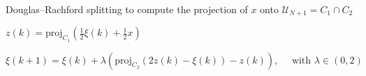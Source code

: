 \documentclass[10pt]{article}
\newtheorem{definitiox	n}{Definition}{\it}{}
\newtheorem{assumption}{Assumption}{\it}{}
\newcommand{\mc}{\mathcal}
\newcommand{\bb}{\mathbb}
\newcommand{\proj}{\mathrm{proj}}
\newcommand{\0}{\mathbf{0}}
\newcommand{\1}{\mathbf{1}}
\begin{document}
\begin{algorithm}[]
\caption{Douglas--Rachford splitting to compute the projection of $x$ onto $\mathcal{U}_{N+1} = C_1 \cap C_2$}
\begin{algorithmic}[1]

\smallskip
\IUC{ }

\smallskip
\State
$z(k) = \proj_{C_1}(\frac{1}{2} \xi(k) + \frac{1}{2}x)$ 


\smallskip
\State
$\xi(k+1) = \xi(k) + \lambda \left( \proj_{C_2}    (2z(k)-\xi(k)) - z(k)
\right), \quad \text{ with } \lambda \in (0,2)
$
\EndIUC

\end{algorithmic}
\end{algorithm}


%
%
%
\end{document}
